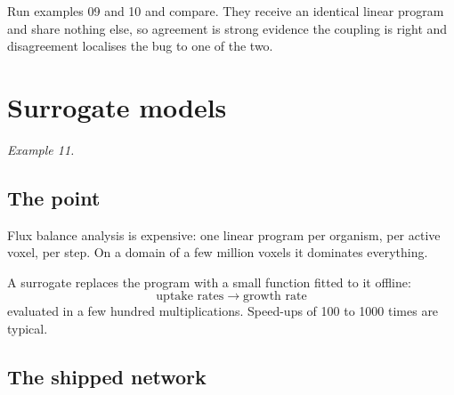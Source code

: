 Run examples 09 and 10 and compare. They receive an identical linear program
and share nothing else, so agreement is strong evidence the coupling is right
and disagreement localises the bug to one of the two.

\chapter{Surrogate models}
\label{ch:surrogate}

\emph{Example 11.}

\section{The point}

Flux balance analysis is expensive: one linear program per organism, per active
voxel, per step. On a domain of a few million voxels it dominates everything.

A surrogate replaces the program with a small function fitted to it offline:
\[
  \text{uptake rates} \;\longrightarrow\; \text{growth rate}
\]
evaluated in a few hundred multiplications. Speed-ups of 100 to 1000 times are
typical.

\section{The shipped network}

\begin{center}
\end{center}

